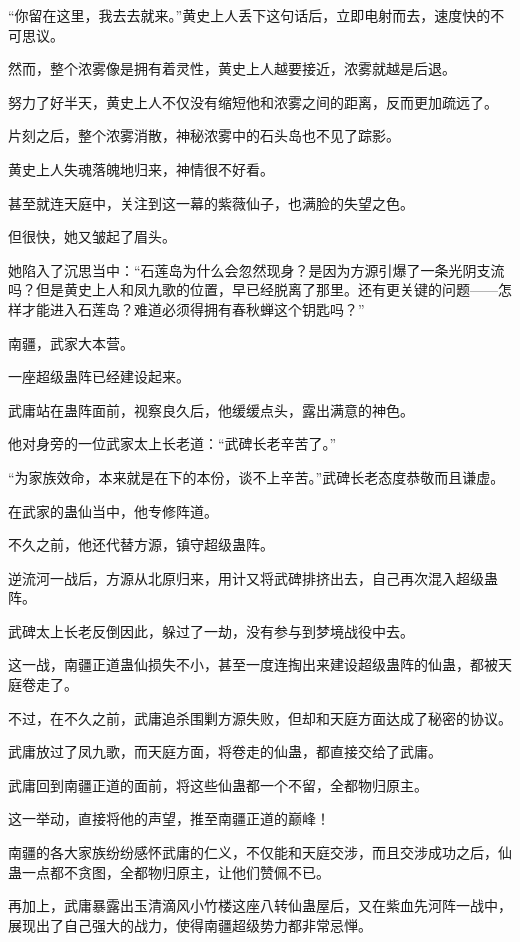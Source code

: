 \begin{this_body}
“你留在这里，我去去就来。”黄史上人丢下这句话后，立即电射而去，速度快的不可思议。

然而，整个浓雾像是拥有着灵性，黄史上人越要接近，浓雾就越是后退。

努力了好半天，黄史上人不仅没有缩短他和浓雾之间的距离，反而更加疏远了。

片刻之后，整个浓雾消散，神秘浓雾中的石头岛也不见了踪影。

黄史上人失魂落魄地归来，神情很不好看。

甚至就连天庭中，关注到这一幕的紫薇仙子，也满脸的失望之色。

但很快，她又皱起了眉头。

她陷入了沉思当中：“石莲岛为什么会忽然现身？是因为方源引爆了一条光阴支流吗？但是黄史上人和凤九歌的位置，早已经脱离了那里。还有更关键的问题——怎样才能进入石莲岛？难道必须得拥有春秋蝉这个钥匙吗？”

南疆，武家大本营。

一座超级蛊阵已经建设起来。

武庸站在蛊阵面前，视察良久后，他缓缓点头，露出满意的神色。

他对身旁的一位武家太上长老道：“武碑长老辛苦了。”

“为家族效命，本来就是在下的本份，谈不上辛苦。”武碑长老态度恭敬而且谦虚。

在武家的蛊仙当中，他专修阵道。

不久之前，他还代替方源，镇守超级蛊阵。

逆流河一战后，方源从北原归来，用计又将武碑排挤出去，自己再次混入超级蛊阵。

武碑太上长老反倒因此，躲过了一劫，没有参与到梦境战役中去。

这一战，南疆正道蛊仙损失不小，甚至一度连掏出来建设超级蛊阵的仙蛊，都被天庭卷走了。

不过，在不久之前，武庸追杀围剿方源失败，但却和天庭方面达成了秘密的协议。

武庸放过了凤九歌，而天庭方面，将卷走的仙蛊，都直接交给了武庸。

武庸回到南疆正道的面前，将这些仙蛊都一个不留，全都物归原主。

这一举动，直接将他的声望，推至南疆正道的巅峰！

南疆的各大家族纷纷感怀武庸的仁义，不仅能和天庭交涉，而且交涉成功之后，仙蛊一点都不贪图，全都物归原主，让他们赞佩不已。

再加上，武庸暴露出玉清滴风小竹楼这座八转仙蛊屋后，又在紫血先河阵一战中，展现出了自己强大的战力，使得南疆超级势力都非常忌惮。


\end{this_body}
